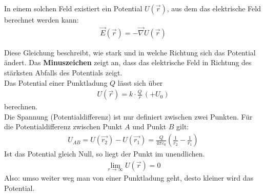 \documentclass{article}
\begin{document}
\noindent In einem solchen Feld existiert ein Potential \( U(\vec{r}) \), aus dem das elektrische Feld berechnet werden kann:
\begin{align}
\vec{E}(\vec{r}) = -\vec{\nabla} U(\vec{r})
\end{align}

Diese Gleichung beschreibt, wie stark und in welche Richtung sich das Potential ändert.
Das \textbf{Minuszeichen} zeigt an, dass das elektrische Feld in Richtung des stärksten Abfalls des Potentials zeigt.\\

\noindent Das Potential einer Punktladung $Q$ lässt sich über 
\begin{align}
    U(\vec{r})=k\cdot\frac{Q}{r}\, \left(+U_0\right)
\end{align}
berechnen.\\

\noindent Die Spannung (Potentialdifferenz) ist nur definiert zwischen zwei Punkten.
Für die Potentialdifferenz zwischen Punkt $A$ und Punkt $B$ gilt:
\begin{align}
    U_{AB}=U(\vec{r_2})-U(\vec{r_1})=\frac{Q}{4\pi\varepsilon_0}\left(\frac{1}{r_2}-\frac{1}{r_1}\right)
\end{align}
Ist das Potential gleich Null, so liegt der Punkt im unendlichen. 
\begin{align}
    \lim_{r\to\infty}U(\vec{r})=0
\end{align}
Also: umso weiter weg man von einer Punktladung geht, desto kleiner wird das Potential.
\end{document}
